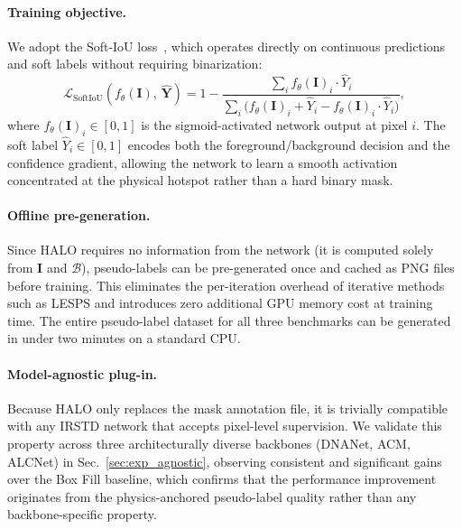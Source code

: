 \paragraph{Training objective.}
We adopt the Soft-IoU loss~\cite{softiou}, which operates directly on continuous
predictions and soft labels without requiring binarization:
\begin{equation}
    \mathcal{L}_\mathrm{SoftIoU}(f_\theta(\mathbf{I}),\,\hat{\mathbf{Y}})
    = 1 - \frac{\sum_i f_\theta(\mathbf{I})_i \cdot \hat{Y}_i}
               {\sum_i \bigl(f_\theta(\mathbf{I})_i + \hat{Y}_i
               - f_\theta(\mathbf{I})_i \cdot \hat{Y}_i\bigr)},
    \label{eq:softiou}
\end{equation}
where $f_\theta(\mathbf{I})_i \in [0,1]$ is the sigmoid-activated network output
at pixel $i$.
The soft label $\hat{Y}_i \in [0,1]$ encodes both the foreground/background decision
and the confidence gradient, allowing the network to learn a smooth activation
concentrated at the physical hotspot rather than a hard binary mask.

\paragraph{Offline pre-generation.}
Since HALO requires no information from the network (it is computed solely from $\mathbf{I}$
and $\mathcal{B}$), pseudo-labels can be pre-generated once and cached as PNG files
before training.
This eliminates the per-iteration overhead of iterative methods such as LESPS and
introduces zero additional GPU memory cost at training time.
The entire pseudo-label dataset for all three benchmarks can be generated in under
two minutes on a standard CPU.

\paragraph{Model-agnostic plug-in.}
Because HALO only replaces the mask annotation file, it is trivially compatible with
any IRSTD network that accepts pixel-level supervision.
We validate this property across three architecturally diverse backbones (DNANet,
ACM, ALCNet) in Sec.~\ref{sec:exp_agnostic}, observing consistent and significant
gains over the Box Fill baseline, which confirms that the performance improvement
originates from the physics-anchored pseudo-label quality rather than any
backbone-specific property.
